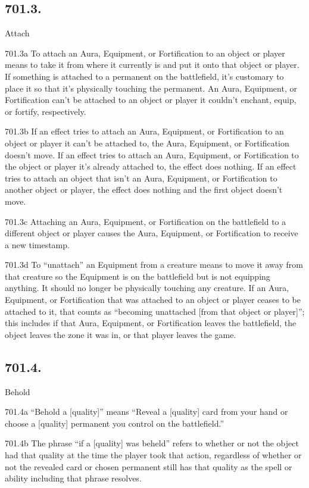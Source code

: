 \subsection*{701.3.}
Attach

701.3a To attach an Aura, Equipment, or Fortification to an object or player means to take it from where it currently is and put it onto that object or player. If something is attached to a permanent on the battlefield, it’s customary to place it so that it’s physically touching the permanent. An Aura, Equipment, or Fortification can’t be attached to an object or player it couldn’t enchant, equip, or fortify, respectively.

701.3b If an effect tries to attach an Aura, Equipment, or Fortification to an object or player it can’t be attached to, the Aura, Equipment, or Fortification doesn’t move. If an effect tries to attach an Aura, Equipment, or Fortification to the object or player it’s already attached to, the effect does nothing. If an effect tries to attach an object that isn’t an Aura, Equipment, or Fortification to another object or player, the effect does nothing and the first object doesn’t move.

701.3c Attaching an Aura, Equipment, or Fortification on the battlefield to a different object or player causes the Aura, Equipment, or Fortification to receive a new timestamp.

701.3d To “unattach” an Equipment from a creature means to move it away from that creature so the Equipment is on the battlefield but is not equipping anything. It should no longer be physically touching any creature. If an Aura, Equipment, or Fortification that was attached to an object or player ceases to be attached to it, that counts as “becoming unattached [from that object or player]”; this includes if that Aura, Equipment, or Fortification leaves the battlefield, the object leaves the zone it was in, or that player leaves the game.

\subsection*{701.4.}
Behold

701.4a “Behold a [quality]” means “Reveal a [quality] card from your hand or choose a [quality] permanent you control on the battlefield.”

701.4b The phrase “if a [quality] was beheld” refers to whether or not the object had that quality at the time the player took that action, regardless of whether or not the revealed card or chosen permanent still has that quality as the spell or ability including that phrase resolves.

